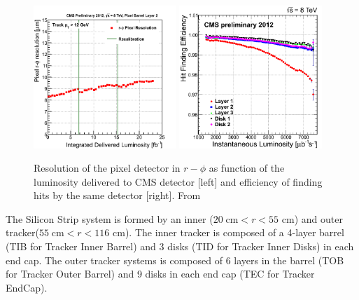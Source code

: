 \begin{figure}[!Hhtbp]
  \begin{center}
    \includegraphics[width=0.48\textwidth]{figs/PXB2_residuals.png}
    \includegraphics[width=0.48\textwidth]{figs/HitEff_vs_InstLumi.png}
    \caption{Resolution of the pixel detector in $r-\phi$ as function of the luminosity delivered to CMS detector [left] and efficiency of finding hits by the same detector [right]. From~\cite{Brochet:1956723}}
    \label{fig:pixelresolution}
  \end{center}
\end{figure}

The Silicon Strip system is formed by an inner ($20\;\text{cm} < r < 55$ cm) and outer tracker($55\;\text{cm} < r < 116$ cm). The inner tracker is composed of a 4-layer barrel (TIB for Tracker Inner Barrel) and 3 disks (TID for Tracker Inner Disks) in each end cap. The outer tracker systems is composed of 6 layers in the barrel (TOB for Tracker Outer Barrel) and 9 disks in each end cap (TEC for Tracker EndCap).


